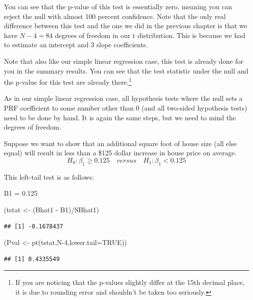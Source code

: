 \documentclass[
]{book}
\newenvironment{Shaded}{\begin{snugshade}}{\end{snugshade}}
\newcommand{\AttributeTok}[1]{\textcolor[rgb]{0.77,0.63,0.00}{#1}}
\newcommand{\ConstantTok}[1]{\textcolor[rgb]{0.00,0.00,0.00}{#1}}
\newcommand{\DecValTok}[1]{\textcolor[rgb]{0.00,0.00,0.81}{#1}}
\newcommand{\FloatTok}[1]{\textcolor[rgb]{0.00,0.00,0.81}{#1}}
\newcommand{\FunctionTok}[1]{\textcolor[rgb]{0.00,0.00,0.00}{#1}}
\newcommand{\NormalTok}[1]{#1}
\newcommand{\OtherTok}[1]{\textcolor[rgb]{0.56,0.35,0.01}{#1}}
\newcommand{\SpecialCharTok}[1]{\textcolor[rgb]{0.00,0.00,0.00}{#1}}
\begin{document}
You can see that the p-value of this test is essentially zero, meaning you can reject the null with almost 100 percent confidence. Note that the only real difference between this test and the one we did in the previous chapter is that we have \(N-4=84\) degrees of freedom in our t distribution. This is because we had to estimate an intercept and 3 slope coefficients.

Note that also like our simple linear regression case, this test is already done for you in the summary results. You can see that the test statistic under the null and the p-value for this test are already there.\footnote{If you are noticing that the p-values slightly differ at the 15th decimal place, it is due to rounding error and shouldn't be taken too seriously.}

As in our simple linear regression case, all hypothesis tests where the null sets a PRF coefficient to some number other than 0 (and all two-sided hypothesis tests) need to be done by hand. It is again the same steps, but we need to mind the degrees of freedom.

Suppose we want to show that an additional square foot of house size (all else equal) will result in less than a \$125 dollar increase in house price on average.
\[H_0: \beta_1 \geq 0.125 \quad versus \quad H_1:\beta_1 < 0.125\]

This left-tail test is as follows:

\begin{Shaded}
\begin{Highlighting}[]
\NormalTok{B1 }\OtherTok{=} \FloatTok{0.125}

\NormalTok{(tstat }\OtherTok{\textless{}{-}}\NormalTok{ (Bhat1 }\SpecialCharTok{{-}}\NormalTok{ B1)}\SpecialCharTok{/}\NormalTok{SBhat1)}
\end{Highlighting}
\end{Shaded}

\begin{verbatim}
## [1] -0.1678437
\end{verbatim}

\begin{Shaded}
\begin{Highlighting}[]
\NormalTok{(Pval }\OtherTok{\textless{}{-}} \FunctionTok{pt}\NormalTok{(tstat,N}\DecValTok{{-}4}\NormalTok{,}\AttributeTok{lower.tail=}\ConstantTok{TRUE}\NormalTok{))}
\end{Highlighting}
\end{Shaded}

\begin{verbatim}
## [1] 0.4335549
\end{verbatim}
\end{document}

